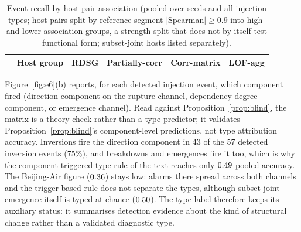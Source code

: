 \documentclass[11pt,a4paper]{article}
\begin{document}
\begin{table}[t]\centering\small
\caption{Event recall by host-pair association (pooled over \eTwoNSeeds{} seeds and
all injection types; host pairs split by reference-segment $|$Spearman$|\ge 0.9$
into high- and lower-association groups, a strength split that does not by
itself test functional form;
subset-joint hosts listed separately).}
\label{tab:e2c}
\begin{tabular}{llcccc}
\hline
 & Host group & RDSG & Partially-corr & Corr-matrix & LOF-agg \\
\hline

\end{tabular}
\end{table}



Figure~\ref{fig:e6}(b) reports, for each detected injection event, which
component fired (direction component on the rupture channel,
dependency-degree component, or emergence channel). Read against
Proposition~\ref{prop:blind}, the matrix is a theory check rather than a type
predictor; it validates Proposition~\ref{prop:blind}'s component-level
predictions, not type attribution accuracy. Inversions fire the direction component in 43 of the 57 detected inversion
events ($75\%$), and breakdowns and emergences
fire it too, which is why the component-triggered type rule of the text
reaches only $0.49{}$ pooled accuracy. The Beijing-Air figure
($0.36{}$) stays low: alarms there spread across both channels and
the trigger-based rule does not separate the types, although subset-joint
emergence itself is typed at chance ($0.50{}$). The type label therefore keeps its auxiliary status: it summarises detection evidence about the kind of structural change rather than a validated diagnostic type.
\end{document}
